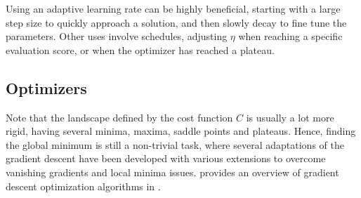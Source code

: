         Using an adaptive learning rate can be highly beneficial, starting with a large step size to quickly approach a solution, and then slowly decay to fine tune the parameters. Other uses involve schedules, adjusting $\eta$ when reaching a specific evaluation score, or when the optimizer has reached a plateau.
    
    \subsection{Optimizers}
    
        Note that the landscape defined by the cost function $C$ is usually a lot more rigid, having several minima, maxima, saddle points and plateaus. Hence, finding the global minimum is still a non-trivial task, where several adaptations of the gradient descent have been developed with various extensions to overcome vanishing gradients and local minima issues. 
        \citeauthor{ruder2017overview} provides an overview of gradient descent optimization algorithms in \cite{ruder2017overview}.
        
